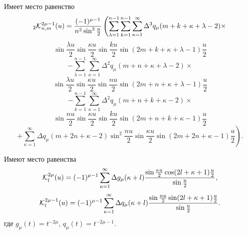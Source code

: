 \begin{lemma}\label{l2.6}
Имеет место равенство
$$
_2\mathcal{ K}_{n,m}^{2\mu-1}(u)={(-1)^{\mu-1}\over n^2\sin^3\frac{u}{2}}\left(\sum\limits_{\lambda=1}^{n-1}\sum_{k=1}^{n-1}
\sum\limits_{\kappa=1}^{\infty}\Delta^3q_\mu(m+k+\kappa+\lambda-2)\times\right.
$$
$$
\sin\frac{\lambda u}{2}\sin\frac{\kappa u}{2}\sin\frac{ku}{2}\sin(2m+k+\kappa+\lambda-1)\frac{u}{2}
$$
$$
 -\sum\limits_{\lambda=1}^{n-1}
\sum\limits_{\kappa=1}^{\infty}\Delta^2q_\mu(m+n+\kappa+\lambda-2)\times
$$
$$
\sin\frac{\lambda u}{2}\sin\frac{\kappa u}{2}\sin\frac{nu}{2}\sin(2m+n+\kappa+\lambda-1)\frac{u}{2}
$$
$$
 -\sum_{k=1}^{n-1}
\sum\limits_{\kappa=1}^{\infty}\Delta^2q_\mu(m+n+k+\kappa-2)\times
$$
$$
\sin\frac{nu}{2}\sin\frac{\kappa u}{2}\sin\frac{ku}{2}\sin(2m+n+k+\kappa-1)\frac{u}{2}
$$
$$
 \left.+\sum\limits_{\kappa=1}^{\infty}\Delta q_\mu(m+2n+\kappa-2)
\sin^2\frac{nu}{2}\sin\frac{\kappa u}{2}\sin(2m+2n+\kappa-1)\frac{u}{2}\right).
$$
\end{lemma}

\begin{lemma}\label{l2.7}
Имеют место равенства
$$
\mathcal{ K}_l^{2\mu}(u)=
(-1)^{\mu-1}\sum_{\kappa=1}^{\infty}
\Delta g_\mu(\kappa+l){\sin\frac{\kappa u}{2}\cos(2l+\kappa+1)\frac{u}{2}\over\sin\frac{u}{2}},
$$
$$
\mathcal{ K}_l^{2\mu-1}(u)=
(-1)^{\mu-1}\sum_{\kappa=1}^{\infty}
\Delta q_\mu(\kappa+l){\sin\frac{\kappa u}{2}\sin(2l+\kappa+1)\frac{u}{2}\over\sin\frac{u}{2}}.
$$
где $g_\mu(t)=t^{-2\mu}$, $q_\mu(t)=t^{-2\mu-1}$.
\end{lemma}
%
%


